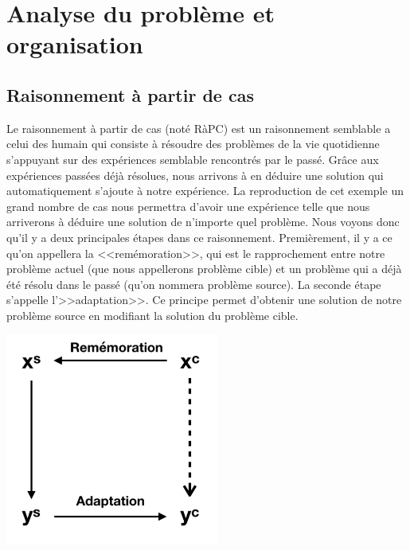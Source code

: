 \documentclass{article}
\begin{document}
\section{Analyse du probl\`{e}me et organisation}

\subsection{Raisonnement \`{a} partir de cas}
Le raisonnement \`{a} partir de cas (not\'{e} R\`{a}PC) est un raisonnement semblable a celui des humain qui consiste \`{a} r\'{e}soudre des probl\`{e}mes de la vie quotidienne s'appuyant sur des exp\'{e}riences semblable rencontr\'{e}s par le pass\'{e}. Gr\^ace aux exp\'{e}riences pass\'{e}es d\'{e}j\`{a} r\'{e}solues, nous arrivons \`{a} en d\'{e}duire une solution qui automatiquement s'ajoute \`{a} notre exp\'{e}rience. La reproduction de cet exemple un grand nombre de cas nous permettra d'avoir une exp\'{e}rience telle que nous arriverons \`{a} d\'{e}duire une solution de n'importe quel probl\`{e}me.
\newline
\newline
Nous voyons donc qu'il y a deux principales \'{e}tapes dans ce raisonnement. Premi\`{e}rement, il y a ce qu'on appellera la <<rem\'{e}moration>>, qui est le rapprochement entre notre probl\`{e}me actuel (que nous appellerons probl\`{e}me cible) et un probl\`{e}me qui a d\'{e}j\`{a} \'{e}t\'{e} r\'{e}solu dans le pass\'{e} (qu'on nommera probl\`{e}me source). La seconde \'{e}tape s'appelle l'>>adaptation>>. Ce principe permet d'obtenir une solution de notre probl\`{e}me source en modifiant la solution du probl\`{e}me cible.
\newline
\newline
\begin{center}
\includegraphics[width=7cm]{img1.png} %
\end{center}
\end{document}
